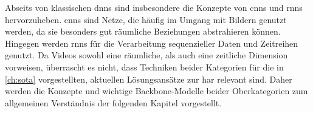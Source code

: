 





Abseits von klassischen \glspl{dnn} sind insbesondere die Konzepte von \glspl{cnn} und \glspl{rnn} hervorzuheben.
\glspl{cnn} sind Netze, die häufig im Umgang mit Bildern genutzt werden, da sie besonders gut räumliche Beziehungen abstrahieren können.
Hingegen werden \glspl{rnn} für die Verarbeitung sequenzieller Daten und Zeitreihen genutzt.
Da Videos sowohl eine räumliche, als auch eine zeitliche Dimension vorweisen, überrascht es nicht, dass Techniken beider Kategorien für die in \autoref{ch:sota} vorgestellten, aktuellen Lösungsansätze zur \gls{har} relevant sind.
Daher werden die Konzepte und wichtige Backbone-Modelle beider Oberkategorien zum allgemeinen Verständnis der folgenden Kapitel vorgestellt.

